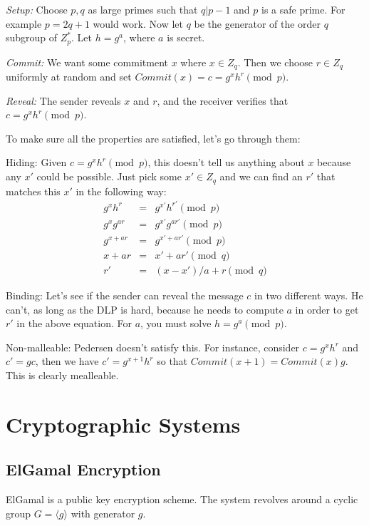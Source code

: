 \documentclass[psamsfonts]{amsart}
\begin{document}
\emph{Setup:} Choose $p,q$ as large primes such that $q | p-1$ and $p$ is a safe prime. For example $p = 2q +1$ would work. Now let $q$ be the generator of the order $q$ subgroup of $Z_p^*$. Let $h = g^a$, where $a$ is secret.

\emph{Commit:} We want some commitment $x$ where $x \in Z_q$. Then we choose $r \in Z_q$ uniformly at random and set $Commit(x) = c = g^x h^r \pmod{p}$.

\emph{Reveal:} The sender reveals $x$ and $r$, and the receiver verifies that $c = g^x h^r \pmod{p}$.

To make sure all the properties are satisfied, let's go through them:

Hiding: Given $c = g^x h^r \pmod{p}$, this doesn't tell us anything about $x$ because any $x'$ could be possible. Just pick some $x' \in Z_q$ and we can find an $r'$ that matches this $x'$ in the following way:
\begin{eqnarray}
  g^{x} h^r &=& g^{x'} h^{r'} \pmod{p} \\
  g^{x} g^{ar} &=& g^{x'} g^{ar'} \pmod{p} \\
    g^{x + ar} &=& g^{x' + ar'} \pmod{p} \\
        x + ar &=& x' + ar' \pmod{q} \\
            r' &=& (x-x')/a + r \pmod{q}
\end{eqnarray}

Binding: Let's see if the sender can reveal the message $c$ in two different ways. He can't, as long as the DLP is hard, because he needs to compute $a$ in order to get $r'$ in the above equation. For $a$, you must solve $h = g^a \pmod{p}$.

Non-malleable: Pedersen doesn't satisfy this. For instance, consider $c = g^x h^r$ and $c' = g c$, then we have $c' = g^{x+1} h^r$ so that $Commit(x+1) = Commit(x)g$. This is clearly mealleable.

\newpage

\section{Cryptographic Systems}

\subsection{ElGamal Encryption}

ElGamal is a public key encryption scheme. The system revolves around a cyclic group $G = \langle g \rangle$ with generator $g$.
\end{document}
